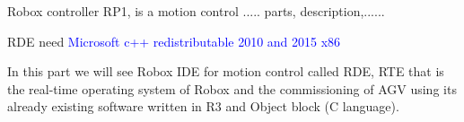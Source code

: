 

Robox controller RP1, is a motion control ..... parts, description,......

RDE need \textcolor{blue}{Microsoft c++ redistributable 2010 and 2015 x86}

In this part we will see Robox IDE for motion control called RDE, RTE that is the real-time operating system of Robox and the commissioning of AGV using its already existing software written in R3 and Object block (C language). 
